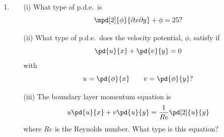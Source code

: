 \documentclass[11pt, oneside]{article}
\begin{document}
\begin{enumerate}
\begin{enumerate}
    \end{enumerate}

  \item %
    \begin{enumerate}
      \item[(i)]
        What type of p.d.e.\ is
        \[
          \mpd[2]{\phi}{\partial x \partial y} + \phi = 25?
        \]

      \item[(ii)]
        What type of p.d.e.\ does the velocity potential, $\phi$, satisfy if
        \[
          \pd{u}{x} + \pd{v}{y} = 0
        \]
        with
        \[
          u = \pd{\phi}{x} \qquad v = \pd{\phi}{y}?
        \]

      \item[(iii)]
        The boundary layer momentum equation is
        \[
          u \pd{u}{x} + v \pd{u}{y} = \frac{1}{Re} \pd[2]{u}{y}
        \]
        where $Re$ is the Reynolds number.
        What type is this equation?
    \end{enumerate}
\end{enumerate}
\end{document}
